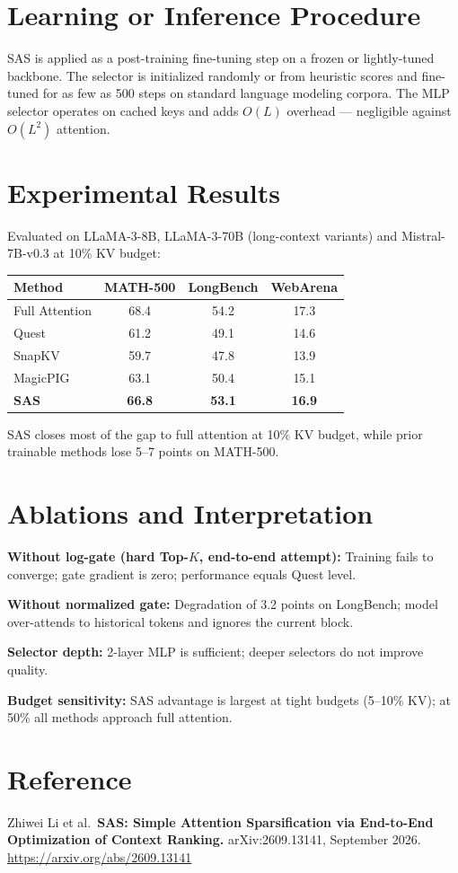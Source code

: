 \documentclass[10pt,twocolumn]{article}
\begin{document}
\section{Learning or Inference Procedure}

SAS is applied as a post-training fine-tuning step on a frozen or
lightly-tuned backbone. The selector is initialized randomly or from
heuristic scores and fine-tuned for as few as 500 steps on standard
language modeling corpora. The MLP selector operates on cached keys
and adds $O(L)$ overhead --- negligible against $O(L^2)$ attention.

\section{Experimental Results}

Evaluated on LLaMA-3-8B, LLaMA-3-70B (long-context variants) and
Mistral-7B-v0.3 at 10\% KV budget:

\begin{center}
\begin{tabular}{lccc}
\toprule
Method & MATH-500 & LongBench & WebArena \\
\midrule
Full Attention  & 68.4 & 54.2 & 17.3 \\
Quest           & 61.2 & 49.1 & 14.6 \\
SnapKV          & 59.7 & 47.8 & 13.9 \\
MagicPIG        & 63.1 & 50.4 & 15.1 \\
\textbf{SAS}    & \textbf{66.8} & \textbf{53.1} & \textbf{16.9} \\
\bottomrule
\end{tabular}
\end{center}

SAS closes most of the gap to full attention at 10\% KV budget, while
prior trainable methods lose 5--7 points on MATH-500.

\section{Ablations and Interpretation}

\textbf{Without log-gate (hard Top-$K$, end-to-end attempt):}
Training fails to converge; gate gradient is zero; performance equals
Quest level.

\textbf{Without normalized gate:} Degradation of 3.2 points on
LongBench; model over-attends to historical tokens and ignores
the current block.

\textbf{Selector depth:} 2-layer MLP is sufficient; deeper selectors
do not improve quality.

\textbf{Budget sensitivity:} SAS advantage is largest at tight budgets
(5--10\% KV); at 50\% all methods approach full attention.

\section*{Reference}

Zhiwei Li et al.\ \textbf{SAS: Simple Attention Sparsification via
End-to-End Optimization of Context Ranking.}
arXiv:2609.13141, September 2026.
\url{https://arxiv.org/abs/2609.13141}
\end{document}
